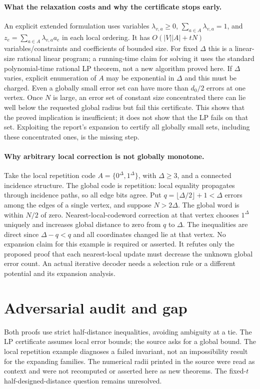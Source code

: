 \documentclass[11pt]{article}
\begin{document}
\paragraph{What the relaxation costs and why the certificate stops early.}
An explicit extended formulation uses variables $\lambda_{v,a}\ge0$,
$\sum_{a\in A}\lambda_{v,a}=1$, and
$z_e=\sum_{a\in A}\lambda_{v,a}a_e$ in each local ordering. It has
$O(|V||A|+tN)$ variables/constraints and coefficients of bounded size.
For fixed $\Delta$ this is a linear-size rational linear program; a running-time
claim for solving it uses the standard polynomial-time rational LP theorem,
not a new algorithm proved here. If $\Delta$ varies, explicit enumeration
of $A$ may be exponential in $\Delta$ and this must be charged.
Even a globally small error set can have more than $d_0/2$ errors at one
vertex. Once $N$ is large, an error set of constant size concentrated there
can lie well below the requested global radius but fail this certificate.
This shows that the proved implication is insufficient; it does not show
that the LP fails on that set. Exploiting the report's expansion to certify
all globally small sets, including these concentrated ones, is the missing step.

\paragraph{Why arbitrary local correction is not globally monotone.}
Take the local repetition code $A=\{0^{\Delta},1^{\Delta}\}$, with
$\Delta\ge3$, and a connected incidence structure. The global code is
repetition: local equality propagates through incidence paths, so all edge
bits agree. Put $q=\lfloor\Delta/2\rfloor+1<\Delta$ errors among the
edges of a single vertex, and suppose $N>2\Delta$. The global word is
within $N/2$ of zero. Nearest-local-codeword correction at that vertex
chooses $1^{\Delta}$ uniquely and increases global distance to zero
from $q$ to $\Delta$. The inequalities are direct since
$\Delta-q<q$ and all coordinates changed lie at that vertex.
No expansion claim for this example is required or asserted. It refutes
only the proposed proof that each nearest-local update must decrease the
unknown global error count. An actual iterative decoder needs a selection
rule or a different potential and its expansion analysis.

\section{Adversarial audit and gap}
Both proofs use strict half-distance inequalities, avoiding ambiguity at a tie.
The LP certificate assumes local error bounds; the source asks for a global
bound. The local repetition example diagnoses a failed invariant, not an
impossibility result for the expanding families. The numerical radii printed
in the source were read as context and were not recomputed or asserted here
as new theorems. The fixed-$t$ half-designed-distance question remains unresolved.
\end{document}

